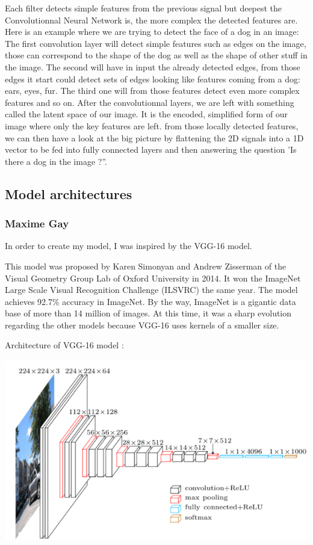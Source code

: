\documentclass[12pt]{article}
\begin{document}
Each filter detects simple features from the previous signal but deepest the Convolutionnal Neural Network is, the more complex the detected features are. Here is an example where we are trying to detect the face of a dog in an image: 
The first convolution layer will detect simple features such as edges on the image, those can correspond to the shape of the dog as well as the shape of other stuff in the image. The second will have in input the already detected edges, from those edges it start could detect sets of edges looking like features coming from a dog: ears, eyes, fur. The third one will from those features detect even more complex features and so on.
After the convolutionnal layers, we are left with something called the latent space of our image. It is the encoded, simplified form of our image where only the key features are left. from those locally detected features, we can then have a look at the big picture by flattening the 2D signals into a 1D vector to be fed into fully connected layers and then answering the question 'Is there a dog in the image ?''.

\newpage

\subsection{Model architectures}

\subsubsection{Maxime Gay}
In order to create my model, I was inspired by the VGG-16 model.

This model was proposed by Karen Simonyan and Andrew Zisserman of the Visual Geometry Group Lab of Oxford University in 2014. It won the ImageNet Large Scale Visual Recognition Challenge (ILSVRC) the same year. The model achieves 92.7\% accuracy in ImageNet. By the way, ImageNet is a gigantic data base of more than 14 million of images. At this time, it was a sharp evolution regarding the other models because VGG-16 uses kernels of a smaller size.


Architecture of VGG-16 model :

\centerline{\includegraphics[height=8cm]{../../docs/VGG16.png}}
\end{document}
